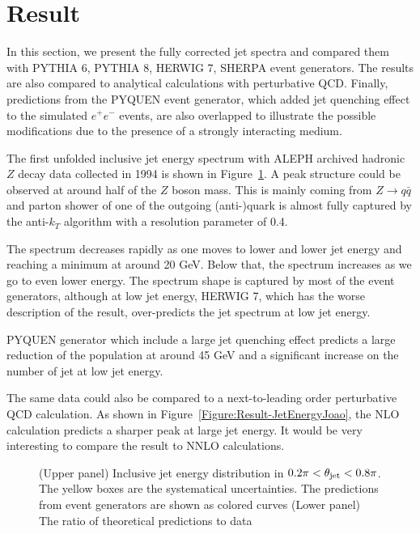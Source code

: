 \section{Result}\label{Section:Result}

In this section, we present the fully corrected jet spectra and compared them with PYTHIA 6, PYTHIA 8, HERWIG 7, SHERPA event generators. The results are also compared to analytical calculations with perturbative QCD. Finally, predictions from the PYQUEN event generator, which added jet quenching effect to the simulated $e^+e^-$ events, are also overlapped to illustrate the possible modifications due to the presence of a strongly interacting medium.

The first unfolded inclusive jet energy spectrum with ALEPH archived hadronic $Z$ decay data collected in 1994 is shown in Figure~\ref{Figure:Result-JetEnergy}. A peak structure could be observed at around half of the $Z$ boson mass. This is mainly coming from $Z\rightarrow q\bar{q}$ and parton shower of one of the outgoing (anti-)quark is almost fully captured by the anti-$k_T$ algorithm with a resolution parameter of 0.4. 

The spectrum decreases rapidly as one moves to lower and lower jet energy and reaching a minimum at around 20 GeV. Below that, the spectrum increases as we go to even lower energy. The spectrum shape is captured by most of the event generators, although at low jet energy, HERWIG 7, which has the worse description of the result, over-predicts the jet spectrum at low jet energy. 

PYQUEN generator which include a large jet quenching effect predicts a large reduction of the population at around 45 GeV and a significant increase on the number of jet at low jet energy.

The same data could also be compared to a next-to-leading order perturbative QCD calculation. As shown in Figure~\ref{Figure:Result-JetEnergyJoao}, the NLO calculation predicts a sharper peak at large jet energy. It would be very interesting to compare the result to NNLO calculations.


\begin{figure}[htp!]
    \centering
    \caption{(Upper panel) Inclusive jet energy distribution in $0.2\pi<\theta_{\rm jet}<0.8 \pi$. The yellow boxes are the systematical uncertainties. The predictions from event generators are shown as colored curves (Lower panel) The ratio of theoretical predictions to data}
    \label{Figure:Result-JetEnergy}
\end{figure}

